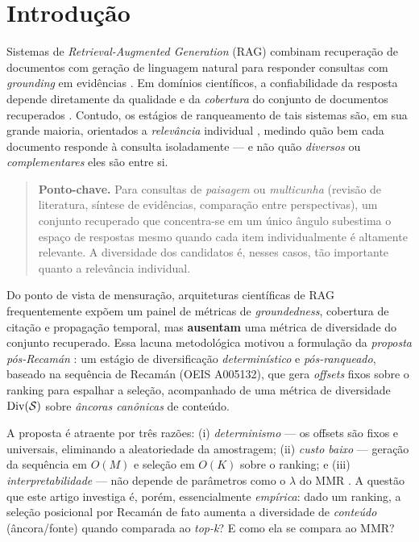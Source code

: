 \section{Introdução}
\label{sec:intro}

Sistemas de \emph{Retrieval-Augmented Generation} (RAG) combinam recuperação de
documentos com geração de linguagem natural para responder consultas com
\emph{grounding} em evidências \citep{Lewis2020RAG}. Em domínios científicos, a
confiabilidade da resposta depende diretamente da qualidade e da \emph{cobertura}
do conjunto de documentos recuperados \citep{Ram2023RetrievalAugmented}. Contudo,
os estágios de ranqueamento de tais sistemas são, em sua grande maioria,
orientados a \emph{relevância} individual \citep{RobertsonZaragoza2009BM25},
medindo quão bem cada documento responde à consulta isoladamente — e não quão
\emph{diversos} ou \emph{complementares} eles são entre si.

\begin{quote}\small
\textbf{Ponto-chave.} Para consultas de \emph{paisagem} ou \emph{multicunha} (revisão de literatura,
síntese de evidências, comparação entre perspectivas), um conjunto recuperado
que concentra-se em um único ângulo subestima o espaço de respostas mesmo quando
cada item individualmente é altamente relevante. A diversidade dos candidatos é,
nesses casos, tão importante quanto a relevância individual.
\end{quote}

Do ponto de vista de mensuração, arquiteturas científicas de RAG frequentemente
expõem um painel de métricas de \emph{groundedness}, cobertura de citação e
propagação temporal, mas \textbf{ausentam} uma métrica de diversidade do conjunto
recuperado. Essa lacuna metodológica motivou a formulação da \emph{proposta
pós-Recamán} \citep{Alekseyev2022RecamanCousins}: um estágio de diversificação
\emph{determinístico} e \emph{pós-ranqueado}, baseado na sequência de Recamán
(OEIS A005132), que gera \emph{offsets} fixos sobre o ranking para espalhar a
seleção, acompanhado de uma métrica de diversidade $\mathrm{Div}(\mathcal{S})$ sobre
\emph{âncoras canônicas} de conteúdo.

A proposta é atraente por três razões: (i) \emph{determinismo} — os offsets são
fixos e universais, eliminando a aleatoriedade da amostragem; (ii) \emph{custo
baixo} — geração da sequência em $O(M)$ e seleção em $O(K)$ sobre o ranking; e
(iii) \emph{interpretabilidade} — não depende de parâmetros como o $\lambda$ do
MMR \citep{CarbonellGoldstein1998MMR}. A questão que este artigo investiga é,
porém, essencialmente \emph{empírica}: dado um ranking, a seleção posicional por
Recamán de fato aumenta a diversidade de \emph{conteúdo} (âncora/fonte) quando
comparada ao \emph{top-k}? E como ela se compara ao MMR?

